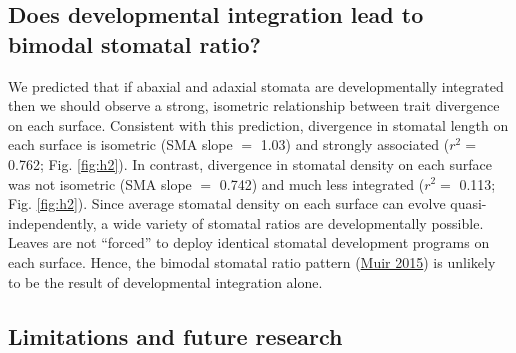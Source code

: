 \documentclass[
  12pt,
]{article}
\begin{document}
\hypertarget{does-developmental-integration-lead-to-bimodal-stomatal-ratio}{%
\subsection{Does developmental integration lead to bimodal stomatal ratio?}\label{does-developmental-integration-lead-to-bimodal-stomatal-ratio}}

We predicted that if abaxial and adaxial stomata are developmentally integrated then we should observe a strong, isometric relationship between trait divergence on each surface. Consistent with this prediction, divergence in stomatal length on each surface is isometric (SMA slope \(=\) 1.03) and strongly associated (\(r^2 =\) 0.762; Fig. \ref{fig:h2}). In contrast, divergence in stomatal density on each surface was not isometric (SMA slope \(=\) 0.742) and much less integrated (\(r^2 =\) 0.113; Fig. \ref{fig:h2}). Since average stomatal density on each surface can evolve quasi-independently, a wide variety of stomatal ratios are developmentally possible. Leaves are not ``forced'' to deploy identical stomatal development programs on each surface. Hence, the bimodal stomatal ratio pattern (\protect\hyperlink{ref-muir_making_2015}{Muir 2015}) is unlikely to be the result of developmental integration alone.

\hypertarget{limitations-and-future-research}{%
\subsection{Limitations and future research}\label{limitations-and-future-research}}
\end{document}
